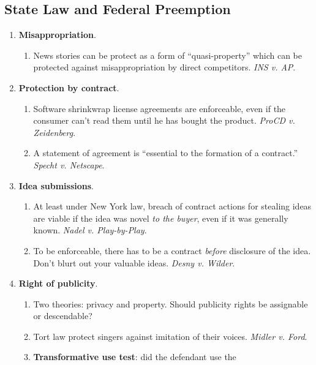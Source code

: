\newpage

\subsection{State Law and Federal Preemption}

\begin{enumerate}
    \item \textbf{Misappropriation}.
    \begin{enumerate}
        \item News stories can be protect as a form of ``quasi-property'' 
        which can be protected against misappropriation by direct competitors.  
        \emph{INS v. AP}.
    \end{enumerate}
    \item \textbf{Protection by contract}.
    \begin{enumerate}
        \item Software shrinkwrap license agreements are enforceable, even if 
        the consumer can't read them until he has bought the product.  
        \emph{ProCD v. Zeidenberg}.
        \item A statement of agreement is ``essential to the formation of a 
        contract.'' \emph{Specht v. Netscape}.
    \end{enumerate}
    \item \textbf{Idea submissions}.
    \begin{enumerate}
        \item At least under New York law, breach of contract actions for 
        stealing ideas are viable if the idea was novel \emph{to the buyer}, 
        even if it was generally known. \emph{Nadel v. Play-by-Play}.
        \item To be enforceable, there has to be a contract \emph{before} 
        disclosure of the idea. Don't blurt out your valuable ideas.  
        \emph{Desny v. Wilder}.
    \end{enumerate}
    \item \textbf{Right of publicity}.
    \begin{enumerate}
        \item Two theories: privacy and property. Should publicity rights be 
        assignable or descendable?
        \item Tort law protect singers against imitation of their voices.  
        \emph{Midler v. Ford}.
        \item \textbf{Transformative use test}: did the defendant use the 

\end{enumerate}
\end{enumerate}
